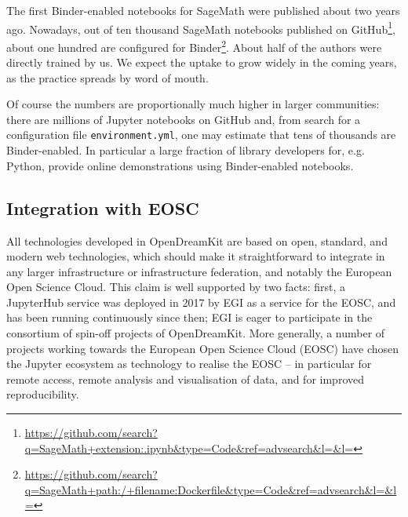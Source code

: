 \documentclass{deliverablereport}
\begin{document}
The first Binder-enabled notebooks for SageMath were published about
two years ago. Nowadays, out of ten thousand SageMath notebooks
published on
GitHub\footnote{\url{https://github.com/search?q=SageMath+extension:.ipynb&type=Code&ref=advsearch&l=&l=}},
about one hundred are configured for
Binder\footnote{\url{https://github.com/search?q=SageMath+path:/+filename:Dockerfile&type=Code&ref=advsearch&l=&l=}}.
About half of the authors were directly trained by us. We expect the
uptake to grow widely in the coming years, as the practice spreads by
word of mouth.

Of course the numbers are proportionally much higher in larger
communities: there are millions of Jupyter notebooks on GitHub and,
from search for a configuration file \texttt{environment.yml}, one may
estimate that tens of thousands are Binder-enabled. In particular a
large fraction of library developers for, e.g. Python, provide online
demonstrations using Binder-enabled notebooks.


\subsection{Integration with EOSC}

All technologies developed in OpenDreamKit are based on open,
standard, and modern web technologies, which should make it
straightforward to integrate in any larger infrastructure or
infrastructure federation, and notably the European Open Science
Cloud. This claim is well supported by two facts: first, a JupyterHub
service was deployed in 2017 by EGI as a service for the EOSC, and has
been running continuously since then; EGI is eager to participate in
the consortium of spin-off projects of OpenDreamKit. More generally, a
number of projects working towards the European Open Science Cloud
(EOSC) have chosen the Jupyter ecosystem as technology to realise
the EOSC -- in particular for remote access, remote analysis and
visualisation of data, and for improved reproducibility.

\end{document}
